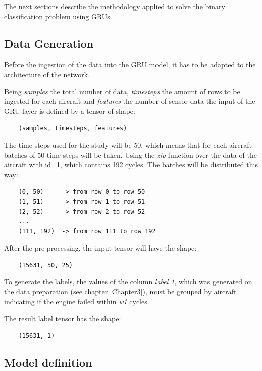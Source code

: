 The next sections describe the methodology applied to solve the binary classification problem using GRUs.

\subsection{Data Generation}

Before the ingestion of the data into the GRU model, it has to be adapted to the architecture of the network.

Being \textit{samples} the total number of data, \textit{timesteps} the amount of rows to be ingested for each aircraft and \textit{features} the number of sensor data the input of the GRU layer is defined by a tensor of shape:

\begin{verbatim}
    (samples, timesteps, features)
\end{verbatim}

The time steps used for the study will be 50, which means that for each aircraft batches of 50 time steps will be taken.
Using the \textit{zip} function over the data of the aircraft with id=1, which contains 192 cycles. The batches will be distributed this way:

\begin{verbatim}
    (0, 50)     -> from row 0 to row 50
    (1, 51)     -> from row 1 to row 51
    (2, 52)     -> from row 2 to row 52
    ...
    (111, 192)  -> from row 111 to row 192
\end{verbatim}

After the pre-processing, the input tensor will have the shape:

\begin{verbatim}
    (15631, 50, 25)
\end{verbatim}

To generate the labels, the values of the column \textit{label 1}, which was generated on the data preparation (see chapter \ref{Chapter3}), must be grouped by aircraft indicating if the engine failed within \textit{w1} cycles.

The result label tensor has the shape:

\begin{verbatim}
    (15631, 1)
\end{verbatim}


\subsection{Model definition}


